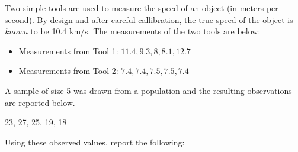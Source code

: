 \documentclass{examsetup}
\begin{document}




\examCoverPage

\begin{questions}
\question


Two simple tools are used to measure the speed of an object (in meters per second). 
By design and after careful callibration, the true speed of the object is \textit{known} to be 10.4 km/s.
The measurements of the two tools are below: 

\begin{itemize}

   \item Measurements from Tool 1: $ 11.4, 9.3, 8, 8.1, 12.7 $ \\

   \item Measurements from Tool 2: $ 7.4, 7.4, 7.5, 7.5, 7.4 $ \\

\end{itemize}



\vspace{1cm}

\question 


A sample of size 5 was drawn from a population and the resulting observations are reported below. 
\begin{center}
23, 27, 25, 19, 18
\end{center}
Using these observed values, report the following:
\vspace{1cm}


\end{questions}
\end{document}
